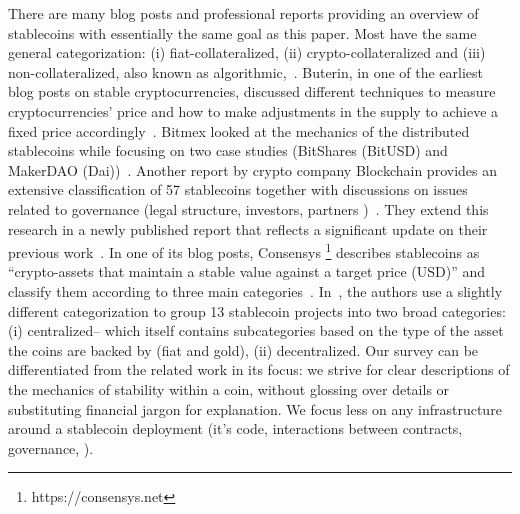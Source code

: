 There are many blog posts and professional reports providing an overview of stablecoins with essentially the same goal as this paper. Most have the same general categorization: (i) fiat-collateralized, (ii) crypto-collateralized and (iii) non-collateralized, also known as algorithmic,\eg~\cite{hackernoon, comprehensiveOverview, linkedin}. Buterin, in one of the earliest blog posts on stable cryptocurrencies, discussed different techniques to measure cryptocurrencies' price and how to make adjustments in the supply to achieve a fixed price accordingly~\cite{TheSearc7:online}. Bitmex looked at the mechanics of the distributed stablecoins while focusing on two case studies (\ie BitShares (BitUSD) and MakerDAO (Dai))~\cite{bitmex}. Another report by crypto company Blockchain provides an extensive classification of 57 stablecoins together with discussions on issues related to governance (\eg legal structure, investors, partners \etc)~\cite{reportone}. They extend this research in a newly published report that reflects a significant update on their previous work~\cite{reporttwo}. In one of its blog posts, Consensys \footnote{https://consensys.net} describes stablecoins as ``crypto-assets that maintain a stable value against a target price (\eg USD)'' and classify them according to three main categories~\cite{StateofS96:online}. In~\cite{cryptoinsider}, the authors use a slightly different categorization to group 13 stablecoin projects into two broad categories: (i) centralized-- which itself contains subcategories based on the type of the asset the coins are backed by (\eg fiat and gold), (ii) decentralized. Our survey can be differentiated from the related work in its focus: we strive for clear descriptions of the mechanics of stability within a coin, without glossing over details or substituting financial jargon for explanation. We focus less on any infrastructure around a stablecoin deployment (\eg it's code, interactions between contracts, governance, \etc).




